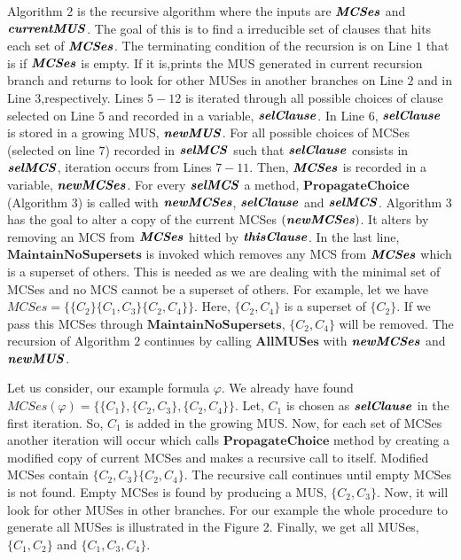 Algorithm $2$ is the recursive algorithm where the inputs are $\textbf{\textit{MCSes}}$ and $\textbf{\textit{currentMUS}}$. The goal of this is to find a irreducible set of clauses that hits each set of $\textbf{\textit{MCSes}}$. The terminating condition of the recursion is on Line $1$ that is if $\textbf{\textit{MCSes}}$ is empty. If it is,prints the MUS generated in current recursion branch and returns to look for other MUSes in another branches on Line $2$ and in Line $3$,respectively. Lines $5-12$ is iterated through all possible choices of clause selected on Line $5$ and recorded in a variable, $\textbf{\textit{selClause}}$. In Line $6$, $\textbf{\textit{selClause}}$ is stored in a growing MUS, $\textbf{\textit{newMUS}}$. For all possible choices of MCSes (selected on line $7$) recorded in $\textbf{\textit{selMCS}}$ such that $\textbf{\textit{selClause}}$ consists in $\textbf{\textit{selMCS}}$, iteration occurs from Lines $7-11$. Then, $\textbf{\textit{MCSes}}$ is recorded in a variable, $\textbf{\textit{newMCSes}}$.\newline
For every $\textbf{\textit{selMCS}}$ a method, $\textbf{PropagateChoice}$ (Algorithm $3$) is called with $\textbf{\textit{newMCSes}}$, $\textbf{\textit{selClause}}$ and $\textbf{\textit{selMCS}}$. Algorithm $3$ has the goal to alter a copy of the current MCSes $(\textbf{\textit{newMCSes}})$. It alters by removing an MCS from $\textbf{\textit{MCSes}}$ hitted by $\textbf{\textit{thisClause}}$. In the last line, $\textbf{MaintainNoSupersets}$ is invoked which removes any MCS from $\textbf{\textit{MCSes}}$ which is a superset of others. This is needed as we are dealing with the minimal set of MCSes and no MCS cannot be a superset of others. For example, let we have $MCSes=\{\{C_{2}\}\{C_{1}, C_{3}\}\{C_{2},C_{4}\}\}$. Here, $\{C_{2},C_{4}\}$ is a superset of $\{C_{2}\}$. If we pass this MCSes through $\textbf{MaintainNoSupersets}$, $\{C_{2},C_{4}\}$ will be removed.\newline
The recursion of Algorithm $2$ continues by calling $\textbf{AllMUSes}$ with $\textbf{\textit{newMCSes}}$ and $\textbf{\textit{newMUS}}$.
\begin{example}
Let us consider, our example formula $\varphi$. We already have found $MCSes(\varphi)=\{\{C_{1}\}, \{C_{2}, C_{3}\}, \{C_{2}, C_{4}\}\}$. Let, $C_{1}$ is chosen as $\textbf{\textit{selClause}}$ in the first iteration. So, $C_{1}$ is added in the growing MUS. Now, for each set of MCSes another iteration will occur which calls $\textbf{PropagateChoice}$ method by creating a modified copy of current MCSes and makes a recursive call to itself. Modified MCSes contain $\{C_{2}, C_{3}\}\{C_{2},C_{4}\}$. The recursive call continues until empty MCSes is not found. Empty MCSes is found by producing a MUS, $\{C_{2}, C_{3}\}$. Now, it will look for other MUSes in other branches. For our example the whole procedure to generate all MUSes is illustrated in the Figure 2. Finally, we get all MUSes, $\{C_{1}, C_{2}\}$ and $\{C_{1},C_{3}, C_{4}\}$.
\end{example}